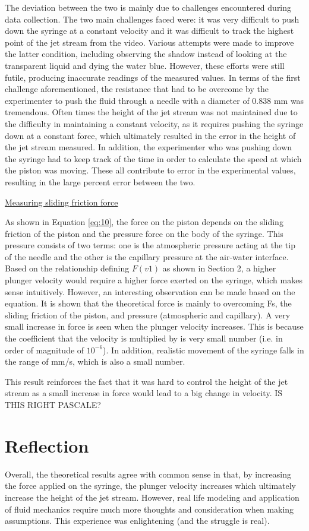 \documentclass{article}
\begin{document}
The deviation between the two is mainly due to challenges encountered during data collection. The two main challenges faced were: it was very difficult to push down the syringe at a constant velocity and it was difficult to track the highest point of the jet stream from the video. Various attempts were made to improve the latter condition, including observing the shadow instead of looking at the transparent liquid and dying the water blue. However, these efforts were still futile, producing inaccurate readings of the measured values. In terms of the first challenge aforementioned, the resistance that had to be overcome by the experimenter to push the fluid through a needle with a diameter of 0.838 mm was tremendous. Often times the height of the jet stream was not maintained due to the difficulty in maintaining a constant velocity, as it requires pushing the syringe down at a constant force, which ultimately resulted in the error in the height of the jet stream measured. In addition, the experimenter who was pushing down the syringe had to keep track of the time in order to calculate the speed at which the piston was moving. These all contribute to error in the experimental values, resulting in the large percent error between the two.

\noindent\underline{Measuring sliding friction force}

As shown in Equation \ref{eq:10}, the force on the piston depends on the sliding friction of the piston and the pressure force on the body of the syringe. This pressure consists of two terms: one is the atmospheric pressure acting at the tip of the needle and the other is the capillary pressure at the air-water interface. Based on the relationship defining $F(v1)$ as shown in Section 2, a higher plunger velocity would require a higher force exerted on the syringe, which makes sense intuitively. However, an interesting observation can be made based on the equation. It is shown that the theoretical force is mainly to overcoming Fs, the sliding friction of the piston, and pressure (atmospheric and capillary). A very small increase in force is seen when the plunger velocity increases. This is because the coefficient that the velocity is multiplied by is very small number (i.e. in order of magnitude of $10^{-6}$). In addition, realistic movement of the syringe falls in the range of mm/s, which is also a small number. 

This result reinforces the fact that it was hard to control the height of the jet stream as a small increase in force would lead to a big change in velocity. IS THIS RIGHT PASCALE?

\section{Reflection}
Overall, the theoretical results agree with common sense in that, by increasing the force applied on the syringe, the plunger velocity increases which ultimately increase the height of the jet stream. However, real life modeling and application of fluid mechanics require much more thoughts and consideration when making assumptions. This experience was enlightening (and the struggle is real).


\setlength{\parindent}{1cm} 
\end{document}
